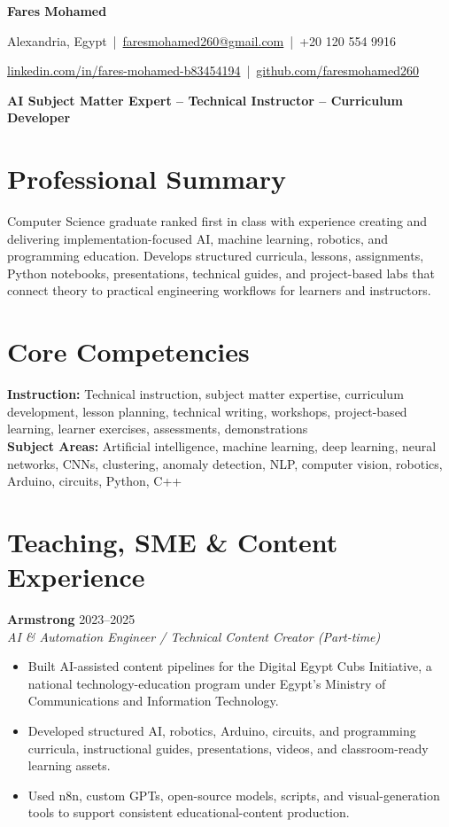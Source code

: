\documentclass[letterpaper]{article}
\newcommand{\roleline}[3]{\textbf{#1} \hfill #2 \\\textit{#3} \\}
\begin{document}
\small
\begin{center}
{\LARGE \textbf{Fares Mohamed}\par}
\vspace{2pt}
Alexandria, Egypt \,|\, \href{mailto:faresmohamed260@gmail.com}{faresmohamed260@gmail.com} \,|\, +20 120 554 9916\par
\href{https://www.linkedin.com/in/fares-mohamed-b83454194/}{linkedin.com/in/fares-mohamed-b83454194} \,|\, \href{https://github.com/faresmohamed260}{github.com/faresmohamed260}\par
\textbf{AI Subject Matter Expert -- Technical Instructor -- Curriculum Developer}\par
\end{center}

\section*{Professional Summary}
Computer Science graduate ranked first in class with experience creating and delivering implementation-focused AI, machine learning, robotics, and programming education. Develops structured curricula, lessons, assignments, Python notebooks, presentations, technical guides, and project-based labs that connect theory to practical engineering workflows for learners and instructors.

\section*{Core Competencies}
\textbf{Instruction:} Technical instruction, subject matter expertise, curriculum development, lesson planning, technical writing, workshops, project-based learning, learner exercises, assessments, demonstrations\\
\textbf{Subject Areas:} Artificial intelligence, machine learning, deep learning, neural networks, CNNs, clustering, anomaly detection, NLP, computer vision, robotics, Arduino, circuits, Python, C++

\section*{Teaching, SME \& Content Experience}
\roleline{Armstrong}{2023--2025}{AI \& Automation Engineer / Technical Content Creator (Part-time)}
\begin{itemize}
\item Built AI-assisted content pipelines for the Digital Egypt Cubs Initiative, a national technology-education program under Egypt's Ministry of Communications and Information Technology.
\item Developed structured AI, robotics, Arduino, circuits, and programming curricula, instructional guides, presentations, videos, and classroom-ready learning assets.
\item Used n8n, custom GPTs, open-source models, scripts, and visual-generation tools to support consistent educational-content production.
\end{itemize}
\end{document}
